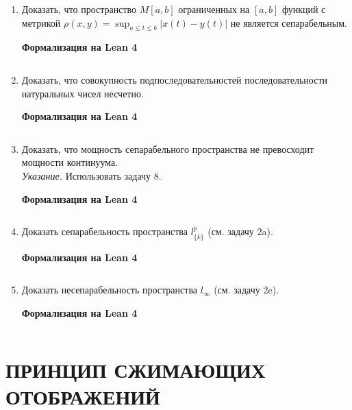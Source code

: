 \documentclass[12pt,a4paper]{article}
\begin{document}
\begin{enumerate}
\begin{center}\small\textbf{Формализация на Lean 4}\end{center}
\inputminted{lean}{FunAn/Section09_Separable/Task06.lean}

\newpage
\item Доказать, что пространство $M[a,b]$ ограниченных на $[a, b]$ функций с метрикой $\rho(x,y)=\sup_{a\le t\le b}|x(t)-y(t)|$ не является сепарабельным.


\begin{center}\small\textbf{Формализация на Lean 4}\end{center}
\inputminted{lean}{FunAn/Section09_Separable/Task07.lean}

\newpage
\item Доказать, что совокупность подпоследовательностей последовательности натуральных чисел несчетно.


\begin{center}\small\textbf{Формализация на Lean 4}\end{center}
\inputminted{lean}{FunAn/Section09_Separable/Task08.lean}

\newpage
\item Доказать, что мощность сепарабельного пространства не превосходит мощности континуума.\\
\textit{Указание.} Использовать задачу 8.


\begin{center}\small\textbf{Формализация на Lean 4}\end{center}
\inputminted{lean}{FunAn/Section09_Separable/Task09.lean}

\newpage
\item Доказать сепарабельность пространства $l_{\{k\}}^{p}$ (см. задачу 2a).


\begin{center}\small\textbf{Формализация на Lean 4}\end{center}
\inputminted{lean}{FunAn/Section09_Separable/Task10.lean}

\newpage
\item Доказать несепарабельность пространства $l_{\infty}$ (см. задачу 2e).

\begin{center}\small\textbf{Формализация на Lean 4}\end{center}
\inputminted{lean}{FunAn/Section09_Separable/Task11.lean}

\end{enumerate}

\section{ПРИНЦИП СЖИМАЮЩИХ ОТОБРАЖЕНИЙ}
\end{document}
